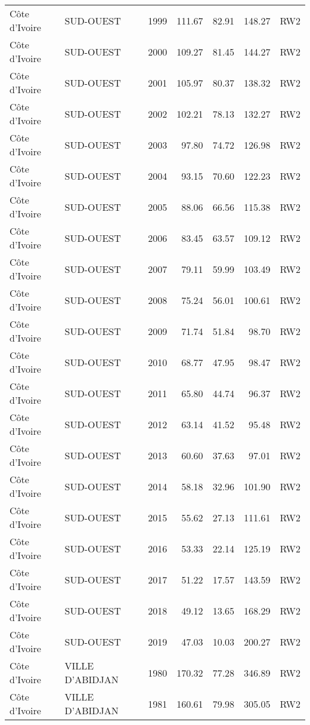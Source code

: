 \begin{longtable}{lllrrrl}
  C\^{o}te d'Ivoire & SUD-OUEST & 1999 & 111.67 & 82.91 & 148.27 & RW2 \\ 
  C\^{o}te d'Ivoire & SUD-OUEST & 2000 & 109.27 & 81.45 & 144.27 & RW2 \\ 
  C\^{o}te d'Ivoire & SUD-OUEST & 2001 & 105.97 & 80.37 & 138.32 & RW2 \\ 
  C\^{o}te d'Ivoire & SUD-OUEST & 2002 & 102.21 & 78.13 & 132.27 & RW2 \\ 
  C\^{o}te d'Ivoire & SUD-OUEST & 2003 & 97.80 & 74.72 & 126.98 & RW2 \\ 
  C\^{o}te d'Ivoire & SUD-OUEST & 2004 & 93.15 & 70.60 & 122.23 & RW2 \\ 
  C\^{o}te d'Ivoire & SUD-OUEST & 2005 & 88.06 & 66.56 & 115.38 & RW2 \\ 
  C\^{o}te d'Ivoire & SUD-OUEST & 2006 & 83.45 & 63.57 & 109.12 & RW2 \\ 
  C\^{o}te d'Ivoire & SUD-OUEST & 2007 & 79.11 & 59.99 & 103.49 & RW2 \\ 
  C\^{o}te d'Ivoire & SUD-OUEST & 2008 & 75.24 & 56.01 & 100.61 & RW2 \\ 
  C\^{o}te d'Ivoire & SUD-OUEST & 2009 & 71.74 & 51.84 & 98.70 & RW2 \\ 
  C\^{o}te d'Ivoire & SUD-OUEST & 2010 & 68.77 & 47.95 & 98.47 & RW2 \\ 
  C\^{o}te d'Ivoire & SUD-OUEST & 2011 & 65.80 & 44.74 & 96.37 & RW2 \\ 
  C\^{o}te d'Ivoire & SUD-OUEST & 2012 & 63.14 & 41.52 & 95.48 & RW2 \\ 
  C\^{o}te d'Ivoire & SUD-OUEST & 2013 & 60.60 & 37.63 & 97.01 & RW2 \\ 
  C\^{o}te d'Ivoire & SUD-OUEST & 2014 & 58.18 & 32.96 & 101.90 & RW2 \\ 
  C\^{o}te d'Ivoire & SUD-OUEST & 2015 & 55.62 & 27.13 & 111.61 & RW2 \\ 
  C\^{o}te d'Ivoire & SUD-OUEST & 2016 & 53.33 & 22.14 & 125.19 & RW2 \\ 
  C\^{o}te d'Ivoire & SUD-OUEST & 2017 & 51.22 & 17.57 & 143.59 & RW2 \\ 
  C\^{o}te d'Ivoire & SUD-OUEST & 2018 & 49.12 & 13.65 & 168.29 & RW2 \\ 
  C\^{o}te d'Ivoire & SUD-OUEST & 2019 & 47.03 & 10.03 & 200.27 & RW2 \\ 
  C\^{o}te d'Ivoire & VILLE D'ABIDJAN & 1980 & 170.32 & 77.28 & 346.89 & RW2 \\ 
  C\^{o}te d'Ivoire & VILLE D'ABIDJAN & 1981 & 160.61 & 79.98 & 305.05 & RW2 \\ 

\end{longtable}
